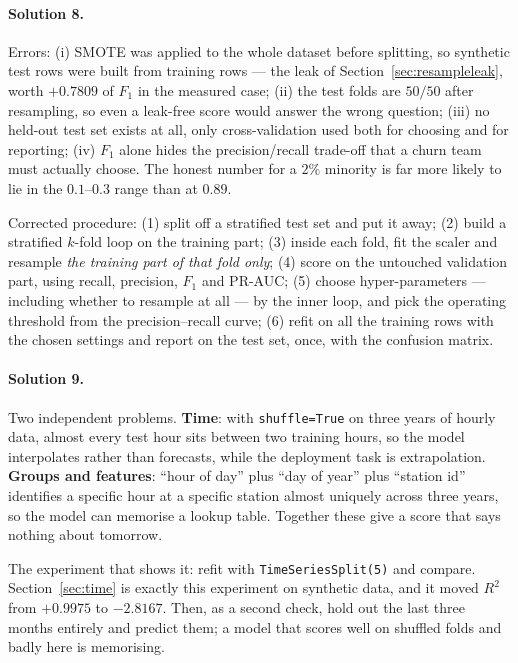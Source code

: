 \documentclass[11pt]{article}
\begin{document}
\paragraph{Solution 8.} Errors: (i) SMOTE was applied to the whole dataset
before splitting, so synthetic test rows were built from training rows --- the
leak of Section~\ref{sec:resampleleak}, worth $+0.7809$ of $F_1$ in the
measured case; (ii) the test folds are $50/50$ after resampling, so even a
leak-free score would answer the wrong question; (iii) no held-out test set
exists at all, only cross-validation used both for choosing and for reporting;
(iv) $F_1$ alone hides the precision/recall trade-off that a churn team must
actually choose. The honest number for a $2\%$ minority is far more likely to
lie in the $0.1$--$0.3$ range than at $0.89$.

Corrected procedure: (1) split off a stratified test set and put it away;
(2) build a stratified $k$-fold loop on the training part; (3) inside each
fold, fit the scaler and resample \emph{the training part of that fold only};
(4) score on the untouched validation part, using recall, precision, $F_1$ and
PR-AUC; (5) choose hyper-parameters --- including whether to resample at all
--- by the inner loop, and pick the operating threshold from the
precision--recall curve; (6) refit on all the training rows with the chosen
settings and report on the test set, once, with the confusion matrix.

\paragraph{Solution 9.} Two independent problems. \textbf{Time}: with
\texttt{shuffle=True} on three years of hourly data, almost every test hour
sits between two training hours, so the model interpolates rather than
forecasts, while the deployment task is extrapolation. \textbf{Groups and
features}: ``hour of day'' plus ``day of year'' plus ``station id'' identifies
a specific hour at a specific station almost uniquely across three years, so
the model can memorise a lookup table. Together these give a score that says
nothing about tomorrow.

The experiment that shows it: refit with \texttt{TimeSeriesSplit(5)} and
compare. Section~\ref{sec:time} is exactly this experiment on synthetic data,
and it moved $R^2$ from $+0.9975$ to $-2.8167$. Then, as a second check, hold
out the last three months entirely and predict them; a model that scores well
on shuffled folds and badly here is memorising.
\end{document}
